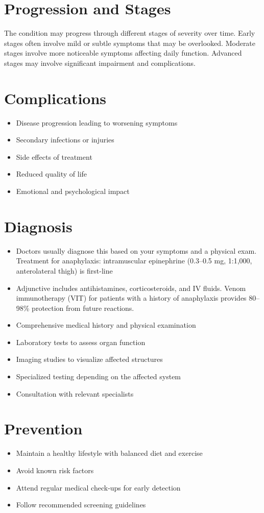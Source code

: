 \section{Progression and Stages}
The condition may progress through different stages of severity over time. Early stages often involve mild or subtle symptoms that may be overlooked. Moderate stages involve more noticeable symptoms affecting daily function. Advanced stages may involve significant impairment and complications.
\section{Complications}
\begin{itemize}[noitemsep]
  \item Disease progression leading to worsening symptoms
  \item Secondary infections or injuries
  \item Side effects of treatment
  \item Reduced quality of life
  \item Emotional and psychological impact
\end{itemize}
\section{Diagnosis}
\begin{itemize}[noitemsep]
  \item Doctors usually diagnose this based on your symptoms and a physical exam. Treatment for anaphylaxis: intramuscular epinephrine (0.3--0.5 mg, 1:1,000, anterolateral thigh) is first-line
  \item Adjunctive includes antihistamines, corticosteroids, and IV fluids. Venom immunotherapy (VIT) for patients with a history of anaphylaxis provides 80--98\% protection from future reactions.
  \item Comprehensive medical history and physical examination
  \item Laboratory tests to assess organ function
  \item Imaging studies to visualize affected structures
  \item Specialized testing depending on the affected system
  \item Consultation with relevant specialists
\end{itemize}
\section{Prevention}
\begin{itemize}[noitemsep]
  \item Maintain a healthy lifestyle with balanced diet and exercise
  \item Avoid known risk factors
  \item Attend regular medical check-ups for early detection
  \item Follow recommended screening guidelines
\end{itemize}
